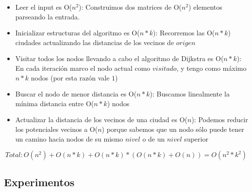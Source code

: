 \begin{itemize}
	\item Leer el input es O($n^2$): Construimos dos matrices de O($n^2$) elementos parseando la entrada.
	\item Inicializar estructuras del algoritmo es O($n*k$): Recorremos las O($n*k$) ciudades actualizando las distancias de los vecinos de $origen$
	\item Visitar todos los nodos llevando a cabo el algoritmo de Dijkstra es O($n*k$): En cada iteración marco el nodo actual como $visitado$, y tengo como máximo $n*k$ nodos (por esta razón vale  \label{whilejust}\hyperref[whileback]{$1$})
	\item Buscar el nodo de menor distancia es O($n*k$):  Buscamos linealmente la mínima distancia entre O($n*k$) nodos
	\item Actualizar la distancia de los vecinos de una ciudad es O($n$): Podemos reducir los potenciales vecinos a O($n$) porque sabemos que un nodo sólo puede tener un camino hacia nodos de su mismo $nivel$ o de un $nivel$ superior
\end{itemize}

$$Total:  O(n^2) + O(n*k) + O(n*k) * (O(n*k) + O(n)) = O(n^2*k^2) $$

\subsection{Experimentos}